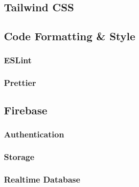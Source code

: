 \subsection{Tailwind CSS}

\subsection{Code Formatting \& Style} \label{CodeF&S}
\subsubsection{ESLint}
\subsubsection{Prettier}
\subsection{Firebase}
\subsubsection{Authentication}
\subsubsection{Storage}
\subsubsection{Realtime Database}
